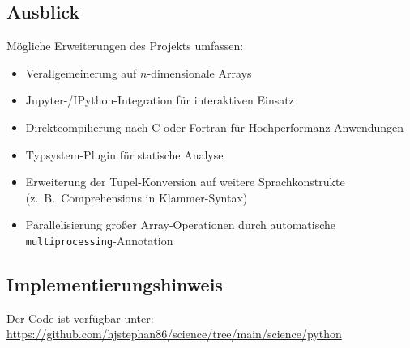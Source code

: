 ﻿\documentclass[a4paper,12pt]{article}
\theoremstyle{definition}
\begin{document}
\subsection{Ausblick}

M\"ogliche Erweiterungen des Projekts umfassen:

\begin{itemize}
	\item Verallgemeinerung auf $n$-dimensionale Arrays
	\item Jupyter-/IPython-Integration f\"ur interaktiven Einsatz
	\item Direktcompilierung nach C oder Fortran f\"ur Hochperformanz-Anwendungen
	\item Typsystem-Plugin f\"ur statische Analyse
	\item Erweiterung der Tupel-Konversion auf weitere Sprachkonstrukte (z.\ B.\
	      Comprehensions in Klammer-Syntax)
	\item Parallelisierung gro\ss{}er Array-Operationen durch automatische
	      \texttt{multiprocessing}-Annotation
\end{itemize}

\subsection{Implementierungshinweis}

Der Code ist verf\"ugbar unter:
\url{https://github.com/hjstephan86/science/tree/main/science/python}
\end{document}
